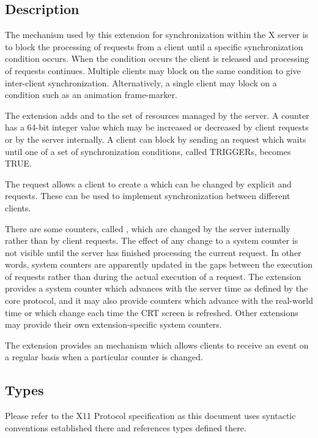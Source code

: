 \subsection*{Description}

The mechanism used by this extension for synchronization within the X server
is to block the processing of requests from a client until a specific
synchronization condition occurs. When the condition occurs the client is
released and processing of requests continues. Multiple clients may block on
the same condition to give inter-client synchronization.  Alternatively, a
single client may block on a condition such as an animation frame-marker.

The extension adds  and  to the set of resources
managed by the server. A counter has a 64-bit integer value which may be
increased or decreased by client requests or by the server internally. A
client can block by sending an  request which waits until
one of a set of synchronization conditions, called TRIGGERs, becomes TRUE.

The  request allows a client to create a
 which can be changed by explicit  and
 requests. These can be used to implement
synchronization between different clients.

There are some counters, called , which are changed by
the server internally rather than by client requests. The effect of any change
to a system counter is not visible until the server has finished processing the
current request. In other words, system counters are apparently updated in the
gaps between the execution of requests rather than during the actual execution
of a request. The extension provides a system counter which advances with the
server time as defined by the core protocol, and it may also provide counters
which advance with the real-world time or which change each time the CRT
screen is refreshed.  Other extensions may provide their own
extension-specific system counters.

The extension provides an  mechanism which allows clients to
receive an event on a regular basis when a particular counter is changed.

\subsection*{Types}

Please refer to the X11 Protocol specification as this document uses
syntactic conventions established there and references types defined there.


